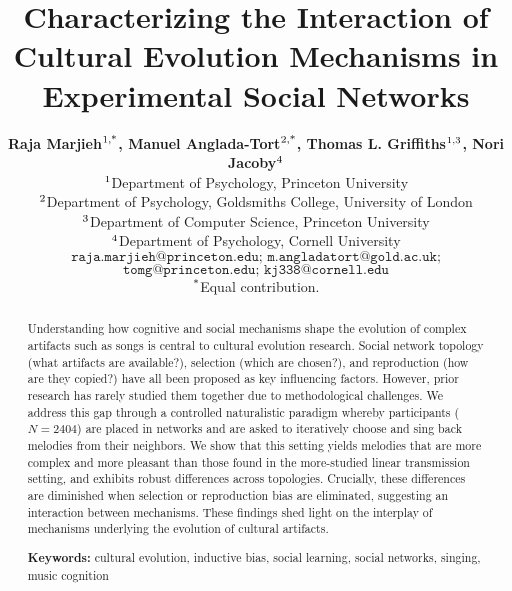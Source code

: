 \documentclass[10pt,letterpaper]{article}
\title{Characterizing the Interaction of Cultural Evolution Mechanisms in\\ Experimental Social Networks}
\author{
{\large \bf Raja Marjieh$\textsuperscript{1,*}$, Manuel Anglada-Tort$\textsuperscript{2,*}$, Thomas L. Griffiths$\textsuperscript{1,3}$, Nori Jacoby$\textsuperscript{4}$} \\
  $\textsuperscript{1}$Department of Psychology, Princeton University\\
  $\textsuperscript{2}$Department of Psychology, Goldsmiths College, University of London\\
  $\textsuperscript{3}$Department of Computer Science, Princeton University\\
  $\textsuperscript{4}$Department of Psychology, Cornell University\\
  $\texttt{raja.marjieh@princeton.edu; m.angladatort@gold.ac.uk;}$ \\ $\texttt{tomg@princeton.edu; kj338@cornell.edu}$ \\
  $\textsuperscript{*}$Equal contribution. 
  }
\begin{document}
\maketitle
\begin{abstract}
Understanding how cognitive and social mechanisms shape the evolution of complex artifacts such as songs is central to cultural evolution research. Social network topology (what artifacts are available?), selection (which are chosen?), and reproduction (how are they copied?) have all been proposed as key influencing factors. However, prior research has rarely studied them together due to methodological challenges. We address this gap through a controlled naturalistic paradigm whereby participants ($N=2404$) are placed in networks and are asked to iteratively choose and sing back melodies from their neighbors. We show that this setting yields melodies that are more complex and more pleasant than those found in the more-studied linear transmission setting, and exhibits robust differences across topologies. Crucially, these differences are diminished when selection or reproduction bias are eliminated, suggesting an interaction between mechanisms. These findings shed light on the interplay of mechanisms underlying the evolution of cultural artifacts.

\textbf{Keywords:} 
cultural evolution, inductive bias, social learning, social networks, singing, music cognition
\end{abstract}
\end{document}
